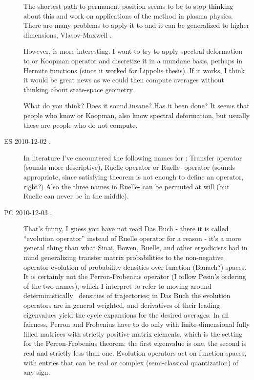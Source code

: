 \begin{description}
The shortest path to permanent position seems to be to stop thinking about this
and work on applications of the method in plasma physics.
There are many problems to apply it to and
it can be generalized to higher dimensions, Vlasov-Maxwell \etc.

However, {\FP} is more interesting.
I want to try to apply spectral deformation to {\FP} or
Koopman operator and discretize it in a mundane basis, perhaps in
Hermite functions (since it worked for Lippolis thesis).
If it works, I think it would be great news as we could then
compute averages without thinking about state-space geometry.

What do you think? Does it sound insane? Has it been done? It seems that
people who know {\FP} or Koopman, also know spectral deformation,
but usually these are people who do not compute.


\item[ES 2010-12-02 \FPoper.]
													\toCB
In literature I've encountered the following names for \FPoper:
 Transfer operator (sounds more descriptive),
Ruelle operator or {Ruelle-\FP} operator (sounds appropriate,
since satisfying {\FP} theorem is not enough to define an operator, right?)
Also the three names in {Ruelle-\FP} can be permuted at will (but Ruelle can
never be in the middle).

\item[PC 2010-12-03 \FPoper.]
													\toCB
That's funny, I guess you have not read Das Buch - there it is called
``evolution oper\-ator'' instead of Ruelle operator for a reason -
it's a more general thing than what Sinai, Bowen, Ruelle, and other ergodicists
had in mind generalizing transfer matrix probabilities
to the non-negative operator evolution of
probability densities  over function (Banach?) spaces.
It is certainly not the Perron-Frobenius oper\-ator
(I follow Pesin's ordering of the two names),
which I interpret to refer to moving  around deterministically \statesp\ densities
of trajectories; in Das Buch the
evolution oper\-ators are in general weighted, and derivatives of their leading
eigenvalues yield the cycle expansions for the desired averages.
In all fairness, Perron and Frobenius have to do only with finite-dimensional
fully filled matrices with strictly positive matrix elements, which is the
setting for the Perron-Frobenius theorem: the first eigenvalue is one,
the second is real and strictly less than one. Evolution oper\-ators act on
function spaces, with entries that can be real or complex (semi-classical quantization)
of any sign.


\end{description}
